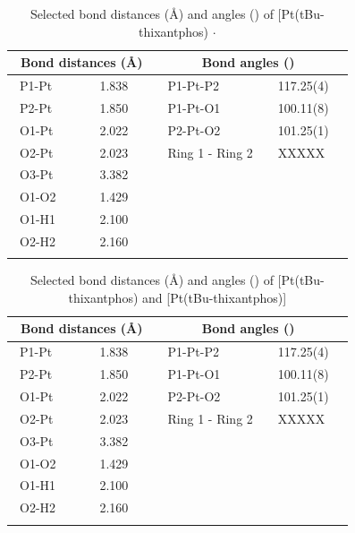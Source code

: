 \begin{table}[ht]
\caption[Selected bond distances (\AA) and angles (\degrees) of [Pt(tBu-thixantphos)\ce{O2}{]} $\cdot{}$ ]{Selected bond distances (\AA) and angles (\degrees) of [Pt(tBu-thixantphos)\ce{O2}{]} $\cdot{}$ } 
\label{table:crystaldioxygen:lengths}
\begin{center}
\begin{tabular}{l l l l}
	\toprule
	\multicolumn{2}{l}{\bfseries{~Bond distances (\si{\angstrom})}} & \multicolumn{2}{c}{\bfseries{Bond angles (\degrees)}} \\
	\midrule		
	~P1-Pt		~~&~~1.838~~	&~~P1-Pt-P2			&~~117.25(4)~~	\\	
	~P2-Pt		~~&~~1.850~~	&~~P1-Pt-O1			&~~100.11(8)~~	\\
	~O1-Pt		~~&~~2.022~~	&~~P2-Pt-O2			&~~101.25(1)~~	\\
	~O2-Pt		~~&~~2.023~~	&~~Ring 1 - Ring 2		&~~XXXXX~~		\\
	~O3-Pt		~~&~~3.382~~	&~~					&~~		~~		\\
	~O1-O2		~~&~~1.429~~	&~~					&~~		~~		\\
	~O1-H1		~~&~~2.100~~	&~~					&~~		~~		\\
	~O2-H2		~~&~~2.160~~	&~~					&~~		~~		\\
	\bottomrule{}
\end{tabular}
\end{center}
\end{table}

\begin{table}[ht]
\caption[Selected bond distances (\AA) and angles (\degrees) of [Pt(tBu-thixantphos)\ce{O2}{]} and [Pt(tBu-thixantphos){]}]{Selected bond distances (\AA) and angles (\degrees) of [Pt(tBu-thixantphos)\ce{O2}{]} and [Pt(tBu-thixantphos)]} 
\label{table:crystal14electron:lengths}
\begin{center}
\begin{tabular}{l l l l}
	\toprule
	\multicolumn{2}{l}{\bfseries{~Bond distances (\si{\angstrom})}} & \multicolumn{2}{c}{\bfseries{Bond angles (\degrees)}} \\
	\midrule		
	~P1-Pt		~~&~~1.838~~	&~~P1-Pt-P2			&~~117.25(4)~~	\\	
	~P2-Pt		~~&~~1.850~~	&~~P1-Pt-O1			&~~100.11(8)~~	\\
	~O1-Pt		~~&~~2.022~~	&~~P2-Pt-O2			&~~101.25(1)~~	\\
	~O2-Pt		~~&~~2.023~~	&~~Ring 1 - Ring 2		&~~XXXXX~~		\\
	~O3-Pt		~~&~~3.382~~	&~~					&~~		~~		\\
	~O1-O2		~~&~~1.429~~	&~~					&~~		~~		\\
	~O1-H1		~~&~~2.100~~	&~~					&~~		~~		\\
	~O2-H2		~~&~~2.160~~	&~~					&~~		~~		\\
	\bottomrule{}
\end{tabular}
\end{center}
\end{table}

